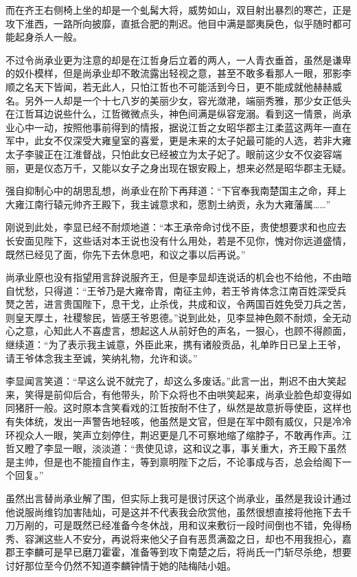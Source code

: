 而在齐王右侧椅上坐的却是一个虬髯大将，威势如山，双目射出暴烈的寒芒，正是攻下淮西，一路所向披靡，直抵合肥的荆迟。他目中满是鄙夷戾色，似乎随时都可能起身杀人一般。

不过令尚承业更为注意的却是在江哲身后立着的两人，一人青衣垂首，虽然是谦卑的奴仆模样，但是尚承业却不敢流露出轻视之意，甚至不敢多看那人一眼，邪影李顺之名天下皆闻，若无此人，只怕江哲也不可能活到今日，更不能成就他赫赫威名。另外一人却是一个十七八岁的美丽少女，容光潋滟，端丽秀雅，那少女正低头在江哲耳边说些什么，江哲微微点头，神色间满是纵容宠溺。看到这一情景，尚承业心中一动，按照他事前得到的情报，据说江哲之女昭华郡主江柔蓝这两年一直在军中，此女不仅深受大雍皇室的喜爱，更是未来的太子妃最可能的人选，若非大雍太子李骏正在江淮督战，只怕此女已经被立为太子妃了。眼前这少女不仅姿容端丽，更是仪态万千，又能以女子之身出现在银安殿上，想来必然是昭华郡主无疑。

强自抑制心中的胡思乱想，尚承业在阶下再拜道：“下官奉我南楚国主之命，拜上大雍江南行辕元帅齐王殿下，我主诚意求和，愿割土纳贡，永为大雍藩属……”

刚说到此处，李显已经不耐烦地道：“本王承帝命讨伐不臣，贵使想要求和也应去长安面见陛下，这些话对本王说也没有什么用处，若是不见你，愧对你远道盛情，既然已经见了面，你先下去休息吧，和议之事以后再说。”

尚承业原也没有指望用言辞说服齐王，但是李显却连说话的机会也不给他，不由暗自忧愁，只得道：“王爷乃是大雍帝胄，南征主帅，若王爷肯体念江南百姓深受兵燹之苦，进言贵国陛下，息干戈，止杀伐，共成和议，令两国百姓免受刀兵之苦，则皇天厚土，社稷黎民，皆感王爷恩德。”说到此处，见李显神色颇不耐烦，全无动心之意，心知此人不喜虚言，想起这人从前好色的声名，一狠心，也顾不得颜面，继续道：“为了表示我主诚意，外臣此来，携有诸般贡品，礼单昨日已呈上王爷，请王爷体念我主至诚，笑纳礼物，允许和谈。”

李显闻言笑道：“早这么说不就完了，却这么多废话。”此言一出，荆迟不由大笑起来，笑得是前仰后合，有他带头，阶下众将也不由哄笑起来，尚承业脸色却变得如同猪肝一般。这时原本含笑看戏的江哲按耐不住了，纵然是故意折辱使臣，这样也有失体统，发出一声警告地轻咳，他虽然是文官，但是在军中颇有威仪，只是冷冷环视众人一眼，笑声立刻停住，荆迟更是几不可察地缩了缩脖子，不敢再作声。江哲又瞪了李显一眼，淡淡道：“贵使见谅，这和议之事，事关重大，齐王殿下虽然是主帅，但是也不能擅自作主，等到禀明陛下之后，不论事成与否，总会给阁下一个回复。”

虽然出言替尚承业解了围，但实际上我可是很讨厌这个尚承业，虽然是我设计通过他说服尚维钧加害陆灿，可是这并不代表我会欣赏他，虽然很想直接将他拖下去千刀万剐的，可是既然已经准备今冬休战，用和议来敷衍一段时间倒也不错，免得杨秀、容渊这些人不安分，再说将来他父子自有恶贯满盈之日，却也不用我担心，嘉郡王李麟可是早已磨刀霍霍，准备等到攻下南楚之后，将尚氏一门斩尽杀绝，想要讨好那位至今仍然不知道李麟钟情于她的陆梅陆小姐。

